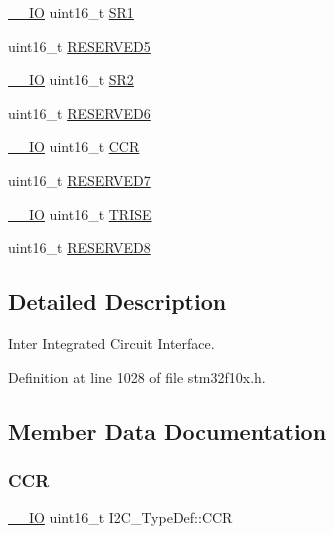 \begin{DoxyCompactItemize}
\item 
\hyperlink{core__sc300_8h_aec43007d9998a0a0e01faede4133d6be}{\+\_\+\+\_\+\+IO} uint16\+\_\+t \hyperlink{struct_i2_c___type_def_ae1602cd1c9cad449523099c97138f991}{S\+R1}
\item 
uint16\+\_\+t \hyperlink{struct_i2_c___type_def_ae736412dcff4daa38bfa8bf8628df316}{R\+E\+S\+E\+R\+V\+E\+D5}
\item 
\hyperlink{core__sc300_8h_aec43007d9998a0a0e01faede4133d6be}{\+\_\+\+\_\+\+IO} uint16\+\_\+t \hyperlink{struct_i2_c___type_def_a95c7f729b10eb2acafe499d9c9a81a83}{S\+R2}
\item 
uint16\+\_\+t \hyperlink{struct_i2_c___type_def_aaf1b319262f53669f49e244d94955a60}{R\+E\+S\+E\+R\+V\+E\+D6}
\item 
\hyperlink{core__sc300_8h_aec43007d9998a0a0e01faede4133d6be}{\+\_\+\+\_\+\+IO} uint16\+\_\+t \hyperlink{struct_i2_c___type_def_a1775e779008da2b4d1807c2b5033b8a5}{C\+CR}
\item 
uint16\+\_\+t \hyperlink{struct_i2_c___type_def_a0f398bdcc3f24e7547c3cb9343111fd0}{R\+E\+S\+E\+R\+V\+E\+D7}
\item 
\hyperlink{core__sc300_8h_aec43007d9998a0a0e01faede4133d6be}{\+\_\+\+\_\+\+IO} uint16\+\_\+t \hyperlink{struct_i2_c___type_def_aaba7a808e4dfae5cc06b197c298af206}{T\+R\+I\+SE}
\item 
uint16\+\_\+t \hyperlink{struct_i2_c___type_def_a6e762751c9d5a1e41efb6033a26d8ed8}{R\+E\+S\+E\+R\+V\+E\+D8}
\end{DoxyCompactItemize}


\subsection{Detailed Description}
Inter Integrated Circuit Interface. 

Definition at line 1028 of file stm32f10x.\+h.



\subsection{Member Data Documentation}
\mbox{\label{struct_i2_c___type_def_a1775e779008da2b4d1807c2b5033b8a5}} 
\subsubsection{\texorpdfstring{C\+CR}{CCR}}
{\footnotesize\ttfamily \hyperlink{core__sc300_8h_aec43007d9998a0a0e01faede4133d6be}{\+\_\+\+\_\+\+IO} uint16\+\_\+t I2\+C\+\_\+\+Type\+Def\+::\+C\+CR}



